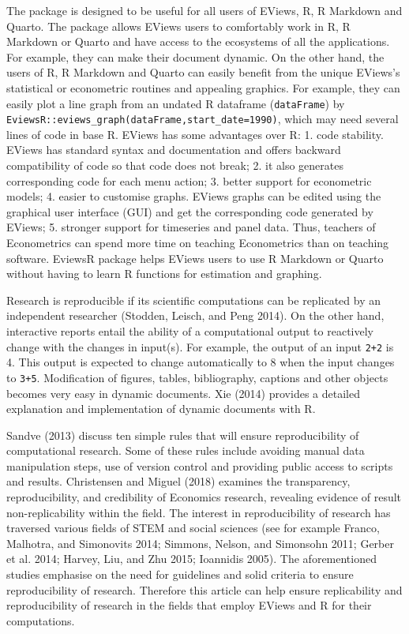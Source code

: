 The  package is designed to be useful for all users of EViews, R, R Markdown and Quarto. The package allows EViews users to comfortably work in R, R Markdown or Quarto and have access to the ecosystems of all the applications. For example, they can make their document dynamic. On the other hand, the users of R, R Markdown and Quarto can easily benefit from the unique EViews's statistical or econometric routines and appealing graphics. For example, they can easily plot a line graph from an undated R dataframe (\texttt{dataFrame}) by \texttt{EviewsR::eviews\_graph(dataFrame,start\_date=1990)}, which may need several lines of code in base R. EViews has some advantages over R: 1. code stability. EViews has standard syntax and documentation and offers backward compatibility of code so that code does not break; 2. it also generates corresponding code for each menu action; 3. better support for econometric models; 4. easier to customise graphs. EViews graphs can be edited using the graphical user interface (GUI) and get the corresponding code generated by EViews; 5. stronger support for timeseries and panel data. Thus, teachers of Econometrics can spend more time on teaching Econometrics than on teaching software. EviewsR package helps EViews users to use R Markdown or Quarto without having to learn R functions for estimation and graphing. \color{black}

Research is reproducible if its scientific computations can be replicated by an independent researcher (Stodden, Leisch, and Peng 2014). On the other hand, interactive reports entail the ability of a computational output to reactively change with the changes in input(s). For example, the output of an input \texttt{2+2} is 4. This output is expected to change automatically to 8 when the input changes to \texttt{3+5}. Modification of figures, tables, bibliography, captions and other objects becomes very easy in dynamic documents. Xie (2014) provides a detailed explanation and implementation of dynamic documents with R.

Sandve (2013) discuss ten simple rules that will ensure reproducibility of computational research. Some of these rules include avoiding manual data manipulation steps, use of version control and providing public access to scripts and results. Christensen and Miguel (2018) examines the transparency, reproducibility, and credibility of Economics research, revealing evidence of result non-replicability within the field. The interest in reproducibility of research has traversed various fields of STEM and social sciences (see for example Franco, Malhotra, and Simonovits 2014; Simmons, Nelson, and Simonsohn 2011; Gerber et al. 2014; Harvey, Liu, and Zhu 2015; Ioannidis 2005). The aforementioned studies emphasise on the need for guidelines and solid criteria to ensure reproducibility of research. Therefore this article can help ensure replicability and reproducibility of research in the fields that employ EViews and R for their computations.

